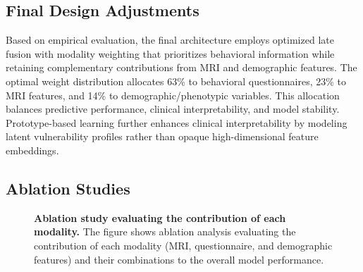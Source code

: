 \documentclass[10pt,letterpaper]{article}
\begin{document}
                                                                                                                          \subsection*{Final Design Adjustments}

                                                                                                                          Based on empirical evaluation, the final architecture employs optimized late fusion with modality weighting that prioritizes behavioral information while retaining complementary contributions from MRI and demographic features. The optimal weight distribution allocates 63\% to behavioral questionnaires, 23\% to MRI features, and 14\% to demographic/phenotypic variables. This allocation balances predictive performance, clinical interpretability, and model stability. Prototype-based learning further enhances clinical interpretability by modeling latent vulnerability profiles rather than opaque high-dimensional feature embeddings.

                                                                                                                          \subsection*{Ablation Studies}

                                                                                                                          \begin{figure}[!ht]
                                                                                                                          \caption{\textbf{Ablation study evaluating the contribution of each modality.}
                                                                                                                          The figure shows ablation analysis evaluating the contribution of each modality (MRI, questionnaire, and demographic features) and their combinations to the overall model performance.}
                                                                                                                          \label{fig:ablation_analysis}
                                                                                                                          \end{figure}
\end{document}

